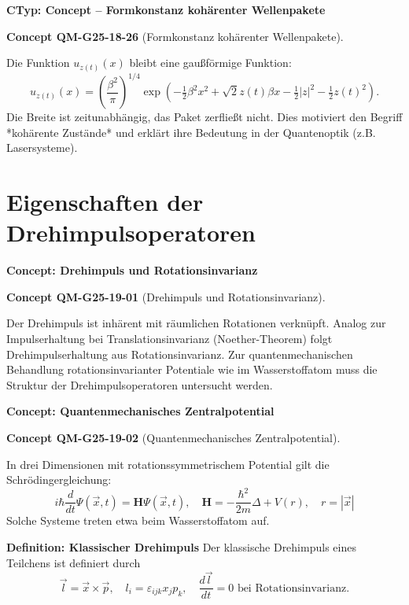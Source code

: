 \documentclass[10pt, letterpaper]{article}
\newcommand{\CustomHeading}[3]{%
  \par\medskip\noindent%
  \textbf{#1 #2} \textnormal{(#3)}.\enskip%
}
\newenvironment{CONC}[2]{\begin{unitbox}\CustomHeading{Concept}{#1}{#2}}{\end{unitbox}}
\begin{document}
\textbf{CTyp: Concept – Formkonstanz kohärenter Wellenpakete}

\begin{CONC}{QM-G25-18-26}{Formkonstanz kohärenter Wellenpakete}
Die Funktion $u_{z(t)}(x)$ bleibt eine gaußförmige Funktion:
\[
u_{z(t)}(x) = \left( \frac{\beta^2}{\pi} \right)^{1/4} \exp\left( -\tfrac{1}{2} \beta^2 x^2 + \sqrt{2} z(t) \beta x - \tfrac{1}{2}|z|^2 - \tfrac{1}{2} z(t)^2 \right).
\]
Die Breite ist zeitunabhängig, das Paket zerfließt nicht. Dies motiviert den Begriff *kohärente Zustände* und erklärt ihre Bedeutung in der Quantenoptik (z.B. Lasersysteme).
\end{CONC}





\pagebreak



\section{Eigenschaften der Drehimpulsoperatoren}

\textbf{Concept: Drehimpuls und Rotationsinvarianz}  


\begin{CONC}{QM-G25-19-01}{Drehimpuls und Rotationsinvarianz}
Der Drehimpuls ist inhärent mit räumlichen Rotationen verknüpft. Analog zur Impulserhaltung bei Translationsinvarianz (Noether-Theorem) folgt Drehimpulserhaltung aus Rotationsinvarianz. Zur quantenmechanischen Behandlung rotationsinvarianter Potentiale wie im Wasserstoffatom muss die Struktur der Drehimpulsoperatoren untersucht werden.
\end{CONC}


\textbf{Concept: Quantenmechanisches Zentralpotential}  
\begin{CONC}{QM-G25-19-02}{Quantenmechanisches Zentralpotential}
In drei Dimensionen mit rotationssymmetrischem Potential gilt die Schrödingergleichung:  
$$
i \hbar \frac{d}{d t} \Psi(\vec{x}, t)=\mathbf{H} \Psi(\vec{x}, t), \quad \mathbf{H}=-\frac{\hbar^{2}}{2 m} \Delta+V(r), \quad r=|\vec{x}|
$$  
Solche Systeme treten etwa beim Wasserstoffatom auf.


\textbf{Definition: Klassischer Drehimpuls}  
Der klassische Drehimpuls eines Teilchens ist definiert durch  
$$
\vec{l} = \vec{x} \times \vec{p}, \quad l_i = \varepsilon_{ijk} x_j p_k, \quad \frac{d\vec{l}}{dt} = 0 \text{ bei Rotationsinvarianz}.
$$
\end{CONC}
\end{document}

